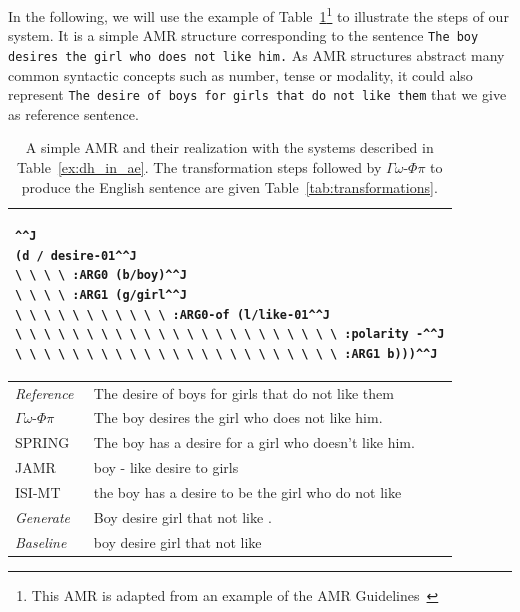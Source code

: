 \documentclass[12pt]{article}
\newcommand{\systeme}[1]{\textsc{#1}}
\newcommand{\gophipy}{$\Gamma\omega$-$\Phi\pi$}
\newcommand{\jamr}{\systeme{JAMR}}
\newcommand{\isimt}{\systeme{ISI-MT}}
\newcommand{\spring}{\systeme{SPRING}}
\newcommand{\representation}[1]{\textsf{#1}}
\newcommand{\AMR}{\representation{AMR}}
\begin{document}
In the following, we will use the example of Table~\ref{ex:paper}\footnote{This \AMR{} is adapted from an example of the AMR Guidelines~\cite{AMR-Guidelines}} to illustrate the steps of our system. It is a simple \AMR{} structure corresponding to the sentence \texttt{The boy desires the girl who does not like him.} As \AMR{} structures abstract many common syntactic concepts such as number, tense or modality, it could also represent \texttt{The desire of boys for girls that do not like them} that we give as reference sentence.
\noindent
\begin{table}
\begin{tabular}{|p{1in}|p{5.25in}|}%
\hline
\multicolumn{2}{|p{6in}|}{
\begin{lstlisting}^^J
(d / desire-01^^J
\ \ \ \ :ARG0 (b/boy)^^J
\ \ \ \ :ARG1 (g/girl^^J
\ \ \ \ \ \ \ \ \ \ \ :ARG0-of (l/like-01^^J
\ \ \ \ \ \ \ \ \ \ \ \ \ \ \ \ \ \ \ \ \ \ \ :polarity -^^J
\ \ \ \ \ \ \ \ \ \ \ \ \ \ \ \ \ \ \ \ \ \ \ :ARG1 b)))^^J
\end{lstlisting}
}\\\hline
\emph{Reference}& The desire of boys for girls that do not like them\\\hline
\gophipy{}&The boy desires the girl who does not like him.\\\hline
\spring{}&The boy has a desire for a girl who doesn't like him.\\\hline
\jamr{}&boy - like desire to girls\\\hline
\isimt{}&the boy has a desire to be the girl who do not like \\\hline
\emph{Generate}&Boy desire girl that not like .\\\hline
\emph{Baseline}&boy desire girl that not like\\
\hline
\end{tabular}
\caption{A simple AMR and their realization with the systems described in Table~\ref{ex:dh_in_ae}. The transformation steps followed by \gophipy{} to produce the English sentence are given Table~\ref{tab:transformations}.}
\label{ex:paper}
\end{table}
\end{document}
